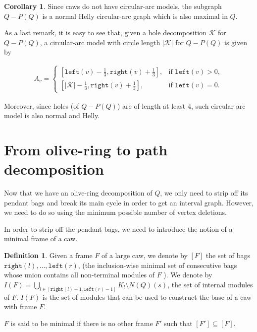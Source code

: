 \documentclass{article}
\theoremstyle{definition}
\newtheorem{defn}[thm]{Definition}
\newtheorem{cor}[thm]{Corollary}
\begin{document}
    \begin{cor}
        Since caws do not have circular-arc models,
        the subgraph $Q - P\left(Q\right)$ is
        a normal Helly circular-arc graph
        which is also maximal in $Q$.
    \end{cor}
    
    As a last remark,
    it is easy to see that,
    given a hole decomposition $\mathcal{K}$ 
    for $Q - P\left(Q\right)$, a circular-arc model
    with circle length $\left|\mathcal{K}\right|$ 
    for $Q - P\left(Q\right)$ is given by
    
    \begin{gather*}
    A_{v} =
    \begin{cases}
    \left[\texttt{left}\left(v\right) - \frac{1}{3}, 
    \texttt{right}\left(v\right) + \frac{1}{3}\right], & \text{if } \texttt{left}\left(v\right) > 0, \\
    \left[\left|\mathcal{K}\right| - \frac{1}{3}, 
    \texttt{right}\left(v\right) + \frac{1}{3}\right], & \text{if } \texttt{left}\left(v\right) = 0.
    \end{cases}
    \end{gather*}
    
    Moreover, since holes (of $Q - P\left(Q\right)$) are of length
    at least $4$, such circular arc model
    is also normal and Helly.
        
    \section{From olive-ring to path decomposition}
    Now that we have an olive-ring
    decomposition of $Q$, we only need to
    strip off its pendant bags and break
    its main cycle in order to get an interval graph.
    However, we need to do so using
    the minimum possible number of vertex
    deletions. 
    
    In order to strip off the pendant
    bags, we need to introduce the notion
    of a minimal frame of a caw.

    \begin{defn}
        Given a frame $F$ of a large caw, we
        denote by $\left[F\right]$
        the set of bags $\texttt{right}\left(l\right),
        \ldots, \texttt{left}\left(r\right)$,
        (the inclusion-wise minimal
        set of consecutive bags whose union contains
        all non-terminal modules of $F$ ).
        We denote by $I\left(F\right) = \bigcup_{l \in \left[
        \texttt{right}\left(l\right) + 1, \texttt{left}\left(r\right) - 1\right]} 
        K_{l} \setminus N\left(Q\right)\left(s\right)$,
        the set of internal modules of $F$.
        $I\left(F\right)$ is the set of
        modules that can be used to construct
        the base of a caw with frame $F$.
        
        $F$ is said to be minimal
        if there is no other frame $F'$ 
        such that $\left[F'\right] \subseteq \left[F\right]$.
    \end{defn}
    
\end{document}
